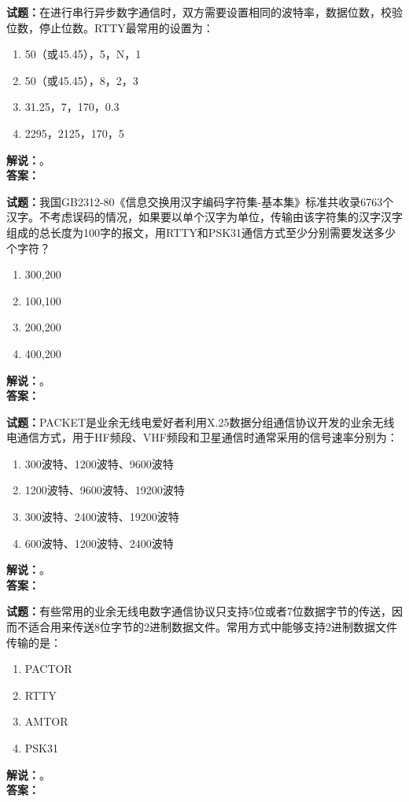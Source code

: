 \documentclass{ctexbook}
\begin{document}
\bigskip

\noindent\textbf{试题：}在进行串行异步数字通信时，双方需要设置相同的波特率，数据位数，校验位数，停止位数。RTTY最常用的设置为：
\begin{enumerate}[leftmargin=3em]
  \item 50（或45.45），5，N，1
  \item 50（或45.45），8，2，3
  \item 31.25，7，170，0.3
  \item 2295，2125，170，5
\end{enumerate}
\noindent\textbf{解说：}\textbf{}。\\\noindent\textbf{答案：}

\bigskip

\noindent\textbf{试题：}我国GB2312-80《信息交换用汉字编码字符集-基本集》标准共收录6763个汉字。不考虑误码的情况，如果要以单个汉字为单位，传输由该字符集的汉字汉字组成的总长度为100字的报文，用RTTY和PSK31通信方式至少分别需要发送多少个字符？
\begin{enumerate}[leftmargin=3em]
  \item 300,200
  \item 100,100
  \item 200,200
  \item 400,200
\end{enumerate}
\noindent\textbf{解说：}\textbf{}。\\\noindent\textbf{答案：}

\bigskip

\noindent\textbf{试题：}PACKET是业余无线电爱好者利用X.25数据分组通信协议开发的业余无线电通信方式，用于HF频段、VHF频段和卫星通信时通常采用的信号速率分别为：
\begin{enumerate}[leftmargin=3em]
  \item 300波特、1200波特、9600波特
  \item 1200波特、9600波特、19200波特
  \item 300波特、2400波特、19200波特
  \item 600波特、1200波特、2400波特
\end{enumerate}
\noindent\textbf{解说：}\textbf{}。\\\noindent\textbf{答案：}

\bigskip

\noindent\textbf{试题：}有些常用的业余无线电数字通信协议只支持5位或者7位数据字节的传送，因而不适合用来传送8位字节的2进制数据文件。常用方式中能够支持2进制数据文件传输的是：
\begin{enumerate}[leftmargin=3em]
  \item PACTOR
  \item RTTY
  \item AMTOR
  \item PSK31
\end{enumerate}
\noindent\textbf{解说：}\textbf{}。\\\noindent\textbf{答案：}
\end{document}

